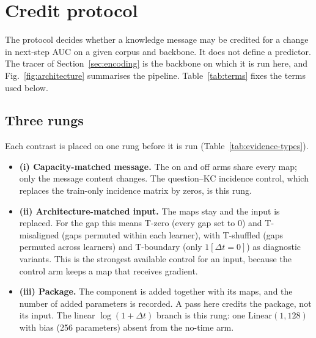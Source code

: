 \section{Credit protocol}
\label{sec:protocol}

The protocol decides whether a knowledge message may be credited for a
change in next-step AUC on a given corpus and backbone. It does not
define a predictor. The tracer of Section~\ref{sec:encoding} is the
backbone on which it is run here, and Fig.~\ref{fig:architecture}
summarises the pipeline. Table~\ref{tab:terms} fixes the terms used below.



\subsection{Three rungs}
\label{sec:protocol-rungs}
Each contrast is placed on one rung before it is run
(Table~\ref{tab:evidence-types}).

\begin{itemize}
  \item \textbf{(i) Capacity-matched message.} The on and off arms share
  every map; only the message content changes. The question--KC
  incidence control, which replaces the train-only incidence matrix by
  zeros, is this rung.
  \item \textbf{(ii) Architecture-matched input.} The maps stay and the
  input is replaced. For the gap this means T-zero (every gap set to
  $0$) and T-misaligned (gaps permuted within each learner), with
  T-shuffled (gaps permuted across learners) and T-boundary (only
  $1[\Delta t{=}0]$) as diagnostic variants. This is the
  strongest available control for an input, because the control arm
  keeps a map that receives gradient.
  \item \textbf{(iii) Package.} The component is added together with
  its maps, and the number of added parameters is recorded. A pass here
  credits the package, not its input. The linear
  $\log(1{+}\Delta t)$ branch is this rung: one
  $\mathrm{Linear}(1,128)$ with bias (256 parameters) absent from the
  no-time arm.
\end{itemize}

